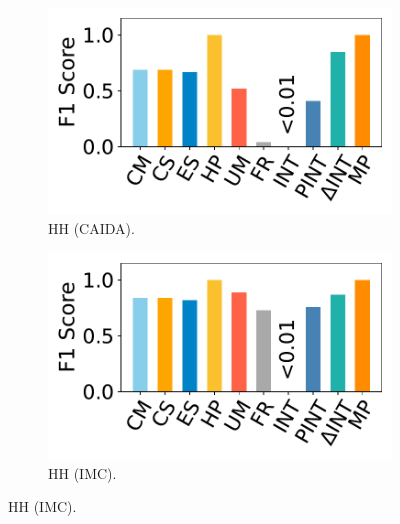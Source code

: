 \begin{figure}[t]
    \centering
    \begin{subfigure}{0.49\linewidth}
    \centering
    \includegraphics[width=\linewidth]{pics/hhF1-caida.pdf}
    \vspace{-20pt}
    \caption{HH (CAIDA).}
    \end{subfigure}
    \begin{subfigure}{0.49\linewidth}
    \centering
    \includegraphics[width=\linewidth]{pics/hhF1-imc.pdf}
    \vspace{-20pt}
    \caption{HH (IMC).}
    \end{subfigure}
    

\end{figure}
